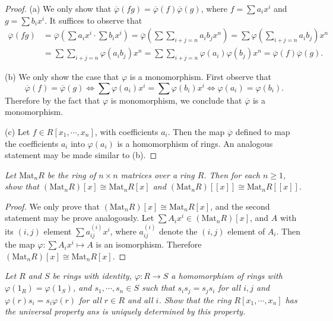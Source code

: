 \begin{proof}
(a) We only show that $\overline{\varphi}(fg)=\overline{\varphi}(f)\overline{\varphi}(g)$, where $f=\sum a_ix^i$ and $g=\sum b_ix^i$. It suffices to observe that 
$$
\begin{aligned}
\overline{\varphi }\left( fg \right) &=\overline{\varphi }\left( \sum{a_ix^i}\cdot \sum{b_ix^i} \right) =\overline{\varphi }\left( \sum{\sum_{i+j=n}{a_ib_j}x^n} \right) =\sum{\varphi \left( \sum_{i+j=n}{a_ib_j} \right) x^n}
\\
&=\sum{\sum_{i+j=n}{\varphi \left( a_ib_j \right) x^n}}=\sum{\sum_{i+j=n}{\varphi \left( a_i \right) \varphi \left( b_j \right) x^n}}=\overline{\varphi }\left( f \right) \overline{\varphi }\left( g \right) .
\end{aligned}
$$\par
(b) We only show the case that $\varphi$ is a monomorphism. First observe that 
$$
\overline{\varphi}\left( f \right) =\overline{\varphi }\left( g \right) \Leftrightarrow \sum{\varphi \left( a_i \right) x^i}=\sum{\varphi \left( b_i \right) x^i}\Leftrightarrow \varphi \left( a_i \right) =\varphi\left( b_i \right) .
$$
Therefore by the fact that $\varphi$ is monomorphism, we conclude that $\overline{\varphi}$ is a monomorphism.\par
(c) Let $f\in R[x_1,\cdots,x_n]$, with coefficients $a_i$. Then the map $\overline{\varphi}$ defined to map the coefficients $a_i$ into $\varphi(a_i)$ is a homomorphism of rings. An analogous statement may be made similar to (b).
\end{proof}
\begin{problem}\em
Let $\mathrm{Mat}_nR$ be the ring of $n\times n$ matrices over a ring $R$. Then for each $n\ge 1$, show that $(\mathrm{Mat}_nR)[x]\cong\mathrm{Mat}_nR[x]$ and $(\mathrm{Mat}_nR)[[x]]\cong\mathrm{Mat}_nR[[x]]$.
\end{problem}
\begin{proof}
We only prove that $(\mathrm{Mat}_nR)[x]\cong\mathrm{Mat}_nR[x]$, and the second statement may be prove analogously. Let $\sum A_ix^i\in(\mathrm{Mat}_nR)[x]$, and $A$ with its $(i,j)$ element $\sum a_{ij}^{(i)}x^i$, where $a_{ij}^{(i)}$ denote the $(i,j)$ element of $A_i$. Then the map $\varphi:\sum A_ix^i\mapsto A$ is an isomorphism. Therefore $(\mathrm{Mat}_nR)[x]\cong\mathrm{Mat}_nR[x]$.
\end{proof}
\begin{problem}\em
Let $R$ and $S$ be rings with identity, $\varphi:R\to S$ a homomorphism of rings with $\varphi(1_R)=\varphi(1_S)$, and $s_1,\cdots,s_n\in S$ such that $s_is_j=s_js_i$ for all $i,j$ and $\varphi(r)s_i=s_i\varphi(r)$ for all $r\in R$ and all $i$. Show that the ring $R[x_1,\cdots,x_n]$ has the universal property ans is uniquely determined by this property.
\end{problem}
